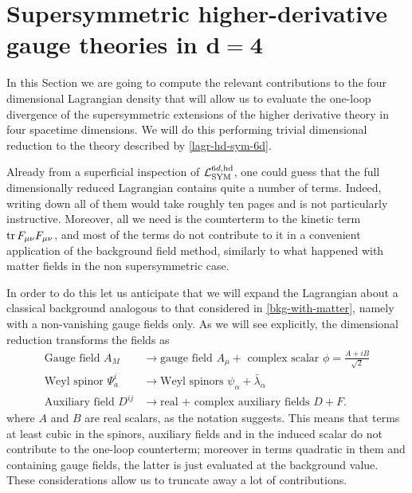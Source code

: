 \section[Supersymmetric higher-derivative gauge theories in \texorpdfstring{${ d=4 }$}{d=4}]{Supersymmetric higher-derivative gauge theories in \texorpdfstring{$\boldsymbol{ d=4 }$}{d=4}}


In this Section we are going to compute the relevant contributions to the four dimensional Lagrangian density that will allow us to evaluate the one-loop divergence of the supersymmetric extensions of the higher derivative \ym{} theory in four spacetime dimensions.
We will do this performing trivial dimensional reduction to the theory described by \eqref{lagr-hd-sym-6d}. 



Already from a superficial inspection of \( { \mathcal{L} }_{{ \text{SYM} }}^{6d,{ \text{hd} }} \), one could guess that the full dimensionally reduced Lagrangian contains quite a number of terms. Indeed, writing down all of them would take roughly ten pages and is not particularly instructive. Moreover, all we need is the counterterm to the kinetic term $\operatorname{tr} F_{\mu\nu}F_{\mu\nu}$, and most of the terms do not contribute to it in a convenient application of the background field method, similarly to what happened with matter fields in the non supersymmetric case. 



In order to do this let us anticipate that we will expand the Lagrangian about a classical background analogous to that considered in \eqref{bkg-with-matter}, namely with a non-vanishing gauge fields only. 
As we will see explicitly, the dimensional reduction transforms the fields as
\begin{align*}
\text{Gauge field } A_M 
&	\longrightarrow 
		\text{gauge field } A_\mu + 
		\text{ complex scalar } \phi = \frac{A + iB }{\sqrt{2} }
\\
\text{Weyl spinor } \Psi^i_a
&	\longrightarrow 
		\text{Weyl spinors } \psi_{ \alpha } + \bar \lambda_{\dot \alpha} 
\\
\text{Auxiliary field } D^{ij}
&	\longrightarrow 
		\text{real + complex auxiliary fields } D + F.	
\end{align*}
where $A$ and $B$ are real scalars, as the notation suggests.
This means that terms at least cubic in the spinors, auxiliary fields and in the induced scalar do not contribute to the one-loop counterterm; moreover in terms quadratic in them and containing gauge fields, the latter is just evaluated at the background value. These considerations allow us to truncate away a lot of contributions.








